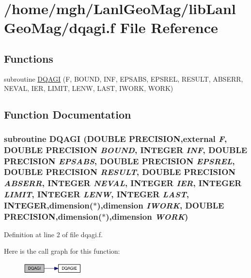 \hypertarget{dqagi_8f}{
\section{/home/mgh/LanlGeoMag/libLanlGeoMag/dqagi.f File Reference}
\label{dqagi_8f}
}
\subsection*{Functions}
\begin{CompactItemize}
\item 
subroutine \hyperlink{dqagi_8f_26b0258ec25eb3725ba606146dc6c364}{DQAGI} (F, BOUND, INF, EPSABS, EPSREL, RESULT, ABSERR, NEVAL, IER, LIMIT, LENW, LAST, IWORK, WORK)
\end{CompactItemize}


\subsection{Function Documentation}
\hypertarget{dqagi_8f_26b0258ec25eb3725ba606146dc6c364}{
\subsubsection[{DQAGI}]{\setlength{\rightskip}{0pt plus 5cm}subroutine DQAGI (DOUBLE PRECISION,external {\em F}, \/  DOUBLE PRECISION {\em BOUND}, \/  INTEGER {\em INF}, \/  DOUBLE PRECISION {\em EPSABS}, \/  DOUBLE PRECISION {\em EPSREL}, \/  DOUBLE PRECISION {\em RESULT}, \/  DOUBLE PRECISION {\em ABSERR}, \/  INTEGER {\em NEVAL}, \/  INTEGER {\em IER}, \/  INTEGER {\em LIMIT}, \/  INTEGER {\em LENW}, \/  INTEGER {\em LAST}, \/  INTEGER,dimension($\ast$),dimension {\em IWORK}, \/  DOUBLE PRECISION,dimension($\ast$),dimension {\em WORK})}}
\label{dqagi_8f_26b0258ec25eb3725ba606146dc6c364}




Definition at line 2 of file dqagi.f.

Here is the call graph for this function:\nopagebreak
\begin{figure}[H]
\begin{center}
\leavevmode
\includegraphics[width=91pt]{dqagi_8f_26b0258ec25eb3725ba606146dc6c364_cgraph}
\end{center}
\end{figure}
